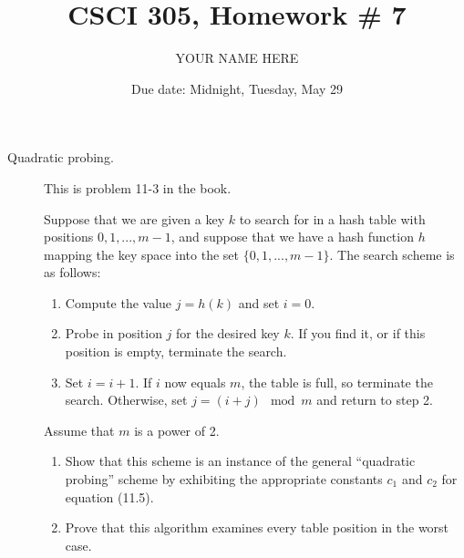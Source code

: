 \documentclass{article}
\title{CSCI 305, Homework \# 7}
\author{YOUR NAME HERE}
\date{Due date:  Midnight, Tuesday, May 29}
\begin{document}
\maketitle

\begin{description}
\item[Quadratic probing.]  This is problem 11-3
  in the book.

  Suppose that we are given a key $k$ to search for in a hash table
  with positions $0,1,...,m-1$, and suppose that we have a hash
  function $h$ mapping the key space into the set $\{0,1,...,m-1\}$.
  The search scheme is as follows:

  \begin{enumerate}
  \item Compute the value $j=h(k)$ and set $i=0$.
    \item Probe in position $j$ for the desired key $k$.  If you find
      it, or if this position is empty, terminate the search.
      \item Set $i=i+1$.  If $i$ now equals $m$, the table is full, so
        terminate the search.  Otherwise, set $j=(i+j)\mod m$ and
        return to step 2.
  \end{enumerate}
  Assume that $m$ is a power of 2.
  \renewcommand{\theenumi}{\alph{enumi}}
  \begin{enumerate}
    \item Show that this scheme is an instance of the general
      ``quadratic probing'' scheme by exhibiting the appropriate
      constants $c_1$ and $c_2$ for equation (11.5).
      \item Prove that this algorithm examines every table position in
        the worst case.
  \end{enumerate}
  

\end{description}
\end{document}
